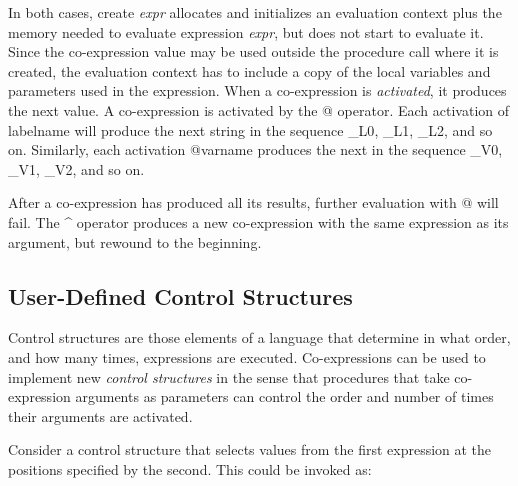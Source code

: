 
In both cases, \textsf{create}\textsf{
}\textsf{\textit{expr}} allocates and initializes an evaluation context
plus the memory needed to evaluate expression \textit{expr}, but does
not start to evaluate it. Since the co-expression value may be used
outside the procedure call where it is created, the evaluation context
has to include a copy of the local variables and parameters used in the
expression. When a co-expression is \textit{activated}, it produces the
next value. A co-expression is activated by the @ operator. Each
activation of \textsf{labelname} will produce the next string in the
sequence \textsf{{\textquotedbl}\_L0{\textquotedbl}},
\textsf{{\textquotedbl}\_L1{\textquotedbl}},
\textsf{{\textquotedbl}\_L2{\textquotedbl}}, and so on. Similarly, each
activation \textsf{@varname}\textsf{ }produces the next in the sequence
\textsf{{\textquotedbl}\_V0{\textquotedbl}},
\textsf{{\textquotedbl}\_V1{\textquotedbl}},
\textsf{{\textquotedbl}\_V2{\textquotedbl}}, and so on. 


After a co-expression has produced all its results, further evaluation
with \textsf{@} will fail. The \textsf{\^{}}
operator produces a new co-expression with the same expression as its
argument, but {\textquotedbl}rewound{\textquotedbl} to the beginning.


\subsection[User{}-Defined Control Structures]{User-Defined Control
Structures}
Control structures are those elements of a
language that determine in what order, and how many times, expressions
are executed. Co-expressions can be used to implement new
\textit{control structures} in the sense that procedures that take
co-expression arguments as parameters can control the order and number
of times their arguments are activated.

Consider a control structure that selects values from the first
expression at the positions specified by the second. This could be
invoked as:


